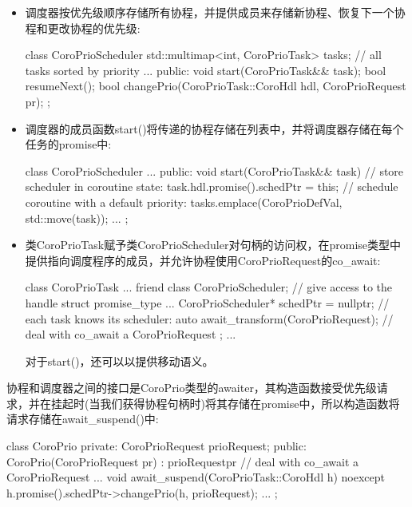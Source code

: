 \begin{itemize}
\item
调度器按优先级顺序存储所有协程，并提供成员来存储新协程、恢复下一个协程和更改协程的优先级:

\begin{cpp}
class CoroPrioScheduler
{
	std::multimap<int, CoroPrioTask> tasks; // all tasks sorted by priority
	...
	public:
	void start(CoroPrioTask&& task);
	bool resumeNext();
	bool changePrio(CoroPrioTask::CoroHdl hdl, CoroPrioRequest pr);
};
\end{cpp}

\item
调度器的成员函数start()将传递的协程存储在列表中，并将调度器存储在每个任务的promise中:

\begin{cpp}
class CoroPrioScheduler
{
	...
	public:
	void start(CoroPrioTask&& task) {
		// store scheduler in coroutine state:
		task.hdl.promise().schedPtr = this;
		// schedule coroutine with a default priority:
		tasks.emplace(CoroPrioDefVal, std::move(task));
	}
	...
};
\end{cpp}

\item
类CoroPrioTask赋予类CoroPrioScheduler对句柄的访问权，在promise类型中提供指向调度程序的成员，并允许协程使用CoroPrioRequest的co\_await:

\begin{cpp}
class CoroPrioTask {
	...
	friend class CoroPrioScheduler; // give access to the handle
	struct promise_type {
		...
		CoroPrioScheduler* schedPtr = nullptr; // each task knows its scheduler:
		auto await_transform(CoroPrioRequest); // deal with co_await a CoroPrioRequest
	};
	...
}
\end{cpp}

对于start()，还可以以提供移动语义。

\end{itemize}

协程和调度器之间的接口是CoroPrio类型的awaiter，其构造函数接受优先级请求，并在挂起时(当我们获得协程句柄时)将其存储在promise中，所以构造函数将请求存储在await\_suspend()中:

\begin{cpp}
class CoroPrio {
private:
	CoroPrioRequest prioRequest;
public:
	CoroPrio(CoroPrioRequest pr)
	: prioRequest{pr} { // deal with co_await a CoroPrioRequest
	}
	...
	void await_suspend(CoroPrioTask::CoroHdl h) noexcept {
		h.promise().schedPtr->changePrio(h, prioRequest);
	}
	...
};
\end{cpp}

